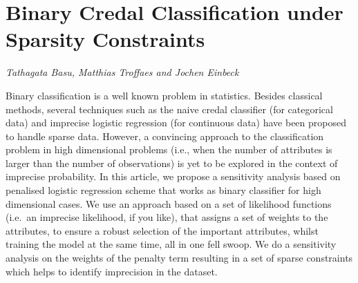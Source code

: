 \documentclass[../booklet.tex]{subfiles}
\begin{document}
\section[Binary Credal Classification under Sparsity Constraints. {\it Tathagata Basu, Matthias Troffaes and Jochen Einbeck}]{Binary Credal Classification under Sparsity Constraints}
  

\begin{center}
  {\it Tathagata Basu, Matthias Troffaes and Jochen Einbeck}
\end{center}

\vskip 0.8cm


Binary classification is a well known problem in statistics. 
Besides classical methods, several techniques such as
the naive credal classifier (for categorical data) and imprecise logistic 
regression (for continuous data) have been proposed
to handle sparse data.
However, a convincing approach to the
classification problem in high dimensional problems (i.e., when the 
number of attributes is larger than the number of observations) is yet to
be explored in the context of imprecise probability. In this
article, we propose a sensitivity analysis based on penalised logistic regression
scheme that works as binary classifier for high dimensional cases.
We use an approach based on a set of likelihood functions (i.e.~an imprecise likelihood, 
if you like),  that assigns a set of weights to the attributes,
to ensure a robust selection of the important attributes,
whilst training the model at the same time, all in one fell swoop.
We do a sensitivity analysis on the weights of the penalty term resulting
in a set of sparse constraints which helps to identify imprecision in the dataset.

\end{document}
